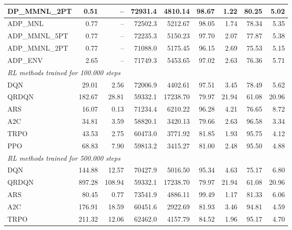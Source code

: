 \begin{samepage}
\begin{center}
\begin{tabular}{l|rr|rr|rr|rr}
    DP\_MMNL\_2PT &     0.51 &    -- &    72931.4 &    4810.14 &   98.67 &    1.22 &   80.25 &    5.02 \\
    \midrule
    ADP\_MNL     &     0.77 &    -- &    72502.3 &    5212.67 &   98.05 &    1.74 &   78.34 &    5.35 \\
    ADP\_MMNL\_5PT &     0.77 &    -- &    72235.3 &    5150.23 &   97.70 &    2.07 &   77.87 &    5.38 \\
    ADP\_MMNL\_2PT &     0.77 &    -- &    71088.0 &    5175.45 &   96.15 &    2.69 &   75.53 &    5.15 \\
    ADP\_ENV     &     2.65 &    -- &    71749.3 &    5453.65 &   97.02 &    2.63 &   76.36 &    5.71 \\
    \midrule
    \multicolumn{9}{l}{\textit{RL methods trained for 100.000 steps}} \\
    \midrule
    DQN          &    29.01 &     2.56 &    72006.9 &    4402.61 &   97.51 &    3.45 &   78.49 &    5.62 \\
    QRDQN        &   182.67 &    28.81 &    59332.1 &   17238.70 &   79.97 &   21.94 &   61.08 &   20.96 \\
    ARS          &    16.07 &     0.13 &    71234.4 &    6210.22 &   96.28 &    4.21 &   76.65 &    8.72 \\
    A2C          &    34.81 &     3.59 &    58820.1 &    3420.13 &   79.66 &    2.63 &   96.58 &    3.34 \\
    TRPO         &    43.53 &     2.75 &    60473.0 &    3771.92 &   81.85 &    1.93 &   95.75 &    4.12 \\
    PPO          &    68.83 &     7.90 &    59813.2 &    3415.27 &   81.00 &    2.48 &   95.50 &    4.88 \\
    \midrule
    \multicolumn{9}{l}{\textit{RL methods trained for 500.000 steps}} \\
    \midrule
    DQN          &   144.88 &    12.57 &    70427.9 &    5016.50 &   95.34 &    4.63 &   75.17 &    6.80 \\
    QRDQN        &   897.28 &   108.94 &    59332.1 &   17238.70 &   79.97 &   21.94 &   61.08 &   20.96 \\
    ARS          &    80.45 &     0.77 &    73541.9 &    4886.11 &   99.49 &    1.17 &   81.33 &    6.06 \\
    A2C          &   176.91 &    18.59 &    60451.6 &    2922.69 &   81.93 &    3.46 &   94.81 &    4.59 \\
    TRPO         &   211.32 &    12.06 &    62462.0 &    4157.79 &   84.52 &    1.96 &   95.17 &    4.70 \\

\end{tabular}
\end{center}
\end{samepage}
